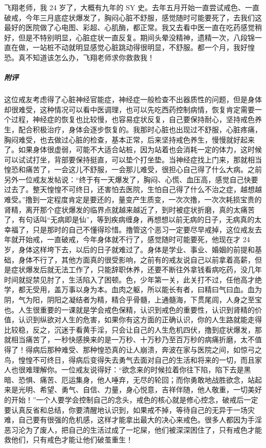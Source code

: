 \begin{case}
    飞翔老师，我 24 岁了，大概有九年的 SY 史。去年五月开始一直尝试戒色、一直破戒，今年三月底症状爆发了，胸闷心脏不舒服，感觉随时可能要死了，去我们这最好的医院做了心电图、彩超、心肌酶，都正常。我又去看中医一直在吃药感觉稍好，但是不特别明显，心脏症状一直反复。期间头晕没精神，遗精一次，八段锦一直在做，一站桩不动就明显感觉心脏跳动得很明显，不舒服。都一个月，我好惶恐。真不知道该怎么办，飞翔老师求你救救我！
    \subparagraph{附评} 这位戒友考虑得了心脏神经官能症，神经症一般检查不出器质性的问题，但是身体却很难受，这种情况可以看中医调理，也可以先吃西药控制病情，恢复肯定需要一个过程，神经症的恢复也比较慢，也容易症状反复，自己要保持耐心，坚持戒色养生，配合积极治疗，身体会逐步恢复的。我那时心脏也出现过不舒服，心脏疼痛，胸闷难受，也去做过心脏的检查，基本正常，后来坚持戒色养生，慢慢就好起来了。如果身体很虚弱，可能不大适合站桩，因为站着也会消耗一定的体力，这时候可以试试打坐，背部要保持挺直，可以垫个打坐垫。当神经症找上门来，那就相当惶恐和痛苦了，一会这儿不舒服，一会那儿难受，很担心自己得了什么大病。之前另外一位戒友发帖说：“终于有一天爆发了，胸闷、心慌、血压高，感觉自己快要过去了。整天惶惶不可终日，还害怕去医院，生怕自己得了什么不治之症，越想越难受。”撸到一定程度肯定是要还的，量变产生质变，一次次撸，一次次耗损宝贵的肾精，离开那个症状爆发的临界点就越来越近了，到时被症状折磨，真的太痛苦了，有句话叫“无病即是仙”，等到疾病缠身，再想想以前无病的日子，无病真的太幸福了，只是那时的自己不懂得珍惜。撸管这个恶习一定要尽早戒掉，这位戒友去年就开始戒，一直破戒，今年身体就不行了，感觉随时可能要死，他现在才 24 岁，身体这样垮下去，以后的日子就难过了。身体是学业、事业、婚姻的前提和基础，身体不行了，其他方面真的很受影响，之前有的戒友说自己以前拿着高薪，但是症状爆发后就无法工作了，只能辞职休养，还要不断往外拿钱看病吃药，没几年时间就捉禁见肘了，生活陷入了困顿。色，少年第一关，此关打不过，任他高才绝学，都无受用，盖万事以身为本。血肉之躯，所以能长有者，曰精曰气曰血。血为阴，气为阳，阴阳之凝结者为精，精合乎骨髓，上通髓海，下贯尾闾，人身之至宝也。人生很重要的一课就是学会戒色保精，认识到戒色的重要性，认识到肾精的价值，认识到纵欲对人生的危害，如果你有这方面的正确认识，你的人生路就能走得比较稳，反之，沉迷于看黄手淫，只会让自己的人生危机四伏，撸到症状爆发，那就相当痛苦了，一秒快感换来的是一万秒、十万秒乃至百万秒的病痛折磨，太不值得了！得病后那种难受、那种惶恐真的让人崩溃，奔波在家与医院之间，如惊弓之鸟，惶惶不可终日，得病后变得失去勇气去面对自己的生活和将来的一切，而且家人也很难理解你。一位戒友说得好：“欲念来的时候拉着你往下陷，陷下去是黑暗、恐惧、痛苦、厄运集身，他人唾弃，无尽的轮回；而你勇敢地战胜欲念，站起来是光明、希望、勇气、自信、力量，身心悦意，吉祥伴随，他人敬重，一切美好的开始！”一个人要学会控制自己的念头，戒色的核心就是修心控念，破戒后一定要认真反省和总结，你要清醒地认识到，如果戒不掉，等待自己的无异于一场灾难，自己要有很强的危机感，这样才能拿出最大的决心来戒色。很多人都因为手淫恶习沦为了废人，把自己的生活过成了一坨屎，他们被深深困住了，只有戒色才能救他们，只有戒色才能让他们破茧重生！
\end{case}

